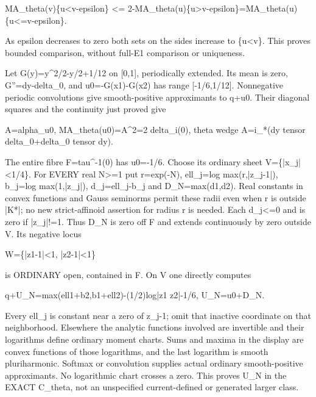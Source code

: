 \documentclass[11pt]{article}
\begin{document}
MA\_theta(v)\{u<v-epsilon\} <= 2-MA\_theta(u)\{u>v-epsilon\}=MA\_theta(u)\{u<=v-epsilon\}.

As epsilon decreases to zero both sets on the sides increase to \{u<v\}. This proves bounded comparison, without full-E1 comparison or uniqueness.

Let G(y)=y\textasciicircum{}2/2-y/2+1/12 on [0,1], periodically extended. Its mean is zero, G''=dy-delta\_0, and u0=-G(x1)-G(x2) has range [-1/6,1/12]. Nonnegative periodic convolutions give smooth-positive approximants to q+u0. Their diagonal squares and the continuity just proved give

A=alpha\_u0, MA\_theta(u0)=A\textasciicircum{}2=2 delta\_i(0),
theta wedge A=i\_*(dy tensor delta\_0+delta\_0 tensor dy).

The entire fibre F=tau\textasciicircum{}-1(0) has u0=-1/6. Choose its ordinary sheet V=\{|x\_j|<1/4\}. For EVERY real N>=1 put r=exp(-N), ell\_j=log max(r,|z\_j-1|), b\_j=log max(1,|z\_j|), d\_j=ell\_j-b\_j and D\_N=max(d1,d2). Real constants in convex functions and Gauss seminorms permit these radii even when r is outside |K*|; no new strict-affinoid assertion for radius r is needed. Each d\_j<=0 and is zero if |z\_j|!=1. Thus D\_N is zero off F and extends continuously by zero outside V. Its negative locus

W=\{|z1-1|<1, |z2-1|<1\}

is ORDINARY open, contained in F. On V one directly computes

q+U\_N=max(ell1+b2,b1+ell2)-(1/2)log|z1 z2|-1/6, U\_N=u0+D\_N.

Every ell\_j is constant near a zero of z\_j-1; omit that inactive coordinate on that neighborhood. Elsewhere the analytic functions involved are invertible and their logarithms define ordinary moment charts. Sums and maxima in the display are convex functions of those logarithms, and the last logarithm is smooth pluriharmonic. Softmax or convolution supplies actual ordinary smooth-positive approximants. No logarithmic chart crosses a zero. This proves U\_N in the EXACT C\_theta, not an unspecified current-defined or generated larger class.
\end{document}
